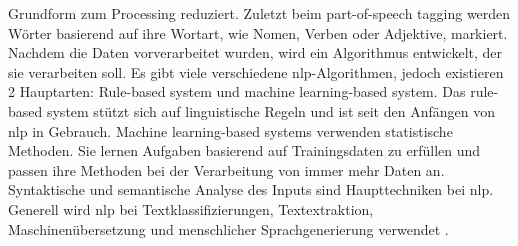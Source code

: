 Grundform zum Processing reduziert. Zuletzt beim part-of-speech tagging werden Wörter basierend auf ihre Wortart, wie Nomen, Verben oder Adjektive, markiert. Nachdem die Daten vorverarbeitet wurden, wird ein Algorithmus entwickelt, der sie verarbeiten soll. Es gibt viele verschiedene \gls{nlp}-Algorithmen, jedoch existieren 2 Hauptarten: Rule-based system und machine learning-based system. Das rule-based system stützt sich auf linguistische Regeln und ist seit den Anfängen von \gls{nlp} in Gebrauch. Machine learning-based systems verwenden statistische Methoden. Sie lernen Aufgaben basierend auf Trainingsdaten zu erfüllen und passen ihre Methoden bei der Verarbeitung von immer mehr Daten an. Syntaktische und semantische Analyse des Inputs sind Haupttechniken bei \gls{nlp}. Generell wird \gls{nlp} bei Textklassifizierungen, Textextraktion, Maschinenübersetzung und menschlicher Sprachgenerierung verwendet \cite{nlp-def}. \\
